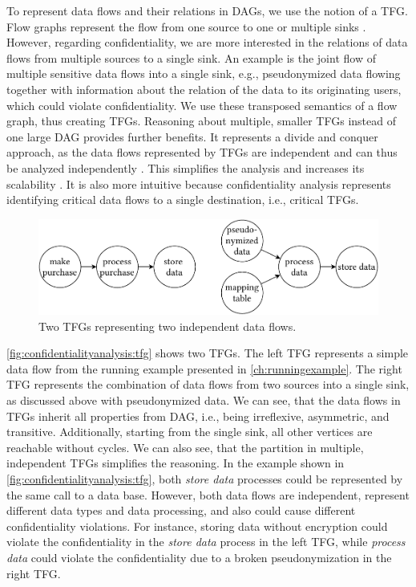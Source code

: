 To represent data flows and their relations in \acp{DAG}, we use the notion of a \acf{TFG}.
Flow graphs represent the flow from one source to one or multiple sinks \cite{knuth_art_1997}.
However, regarding confidentiality, we are more interested in the relations of data flows from multiple sources to a single sink.
An example is the joint flow of multiple sensitive data flows into a single sink, e.g., pseudonymized data flowing together with information about the relation of the data to its originating users, which could violate confidentiality.
We use these transposed semantics of a flow graph, thus creating \acp{TFG}.
Reasoning about multiple, smaller \acp{TFG} instead of one large \ac{DAG} provides further benefits.
It represents a divide and conquer approach, as the data flows represented by \acp{TFG} are independent and can thus be analyzed independently \cite{seifermann_architectural_2022}.
This simplifies the analysis and increases its scalability \cite{schwickerath_tool-supported_2023}.
It is also more intuitive because confidentiality analysis represents identifying critical data flows to a single destination, i.e., critical \acp{TFG}.

\begin{figure}
    \centering
    \includegraphics[width=\linewidth]{figures/chapter7/tfg.pdf}
    \caption{Two \acfp*{TFG} representing two independent data flows.}
    \label{fig:confidentialityanalysis:tfg}
\end{figure}

\autoref{fig:confidentialityanalysis:tfg} shows two \acp{TFG}.
The left \ac{TFG} represents a simple data flow from the running example presented in \autoref{ch:runningexample}.
The right \ac{TFG} represents the combination of data flows from two sources into a single sink, as discussed above with pseudonymized data.
We can see, that the data flows in \acp{TFG} inherit all properties from \ac{DAG}, i.e., being irreflexive, asymmetric, and transitive.
Additionally, starting from the single sink, all other vertices are reachable without cycles.
We can also see, that the partition in multiple, independent \acp{TFG} simplifies the reasoning.
In the example shown in \autoref{fig:confidentialityanalysis:tfg}, both \emph{store data} processes could be represented by the same call to a data base.
However, both data flows are independent, represent different data types and data processing, and also could cause different confidentiality violations.
For instance, storing data without encryption could violate the confidentiality in the \emph{store data} process in the left \ac{TFG}, while \emph{process data} could violate the confidentiality due to a broken pseudonymization in the right \ac{TFG}.

